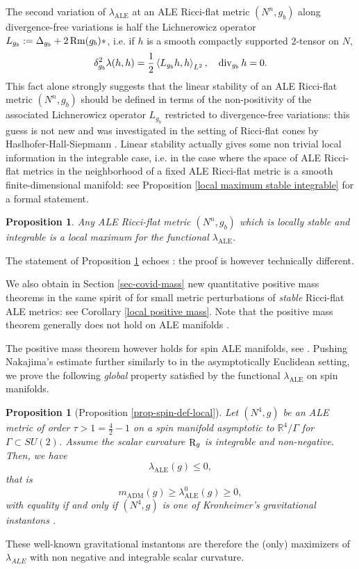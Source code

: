 \documentclass[a4paper,11pt,reqno]{amsart}
\newtheorem{prop}[defn]{Proposition}
\def\Rm{\mathop{\rm Rm}\nolimits}
\def\div{\mathop{\rm div}\nolimits}
\def\Rm{\mathop{\rm Rm}\nolimits}
\def\div{\mathop{\rm div}\nolimits}
\def\R{\mathop{\rm R}\nolimits}
\numberwithin{equation}{section}
\begin{document}
	The second variation of $\lambda_{\operatorname{ALE}}$ at an ALE Ricci-flat metric $(N^n,g_b)$ along divergence-free variations is half the Lichnerowicz operator $L_{g_b}:=\Delta_{g_b}+2\Rm(g_b)\ast$, i.e. if $h$ is a smooth compactly supported $2$-tensor on $N$,
	\begin{equation}
	\delta^2_{g_b}\lambda(h,h)=\frac{1}{2}\left<L_{g_b}h,h\right>_{L^2},\quad \div_{g_b}h=0.
	\end{equation}
	This fact alone strongly suggests that the linear stability of an ALE Ricci-flat metric $(N^n,g_b)$ should be defined in terms of the non-positivity of the associated Lichnerowicz operator $L_{g_b}$ restricted to divergence-free variations: this guess is not new and was investigated in the setting of Ricci-flat cones by Haslhofer-Hall-Siepmann \cite{Hal-Has-Sie}. Linear stability actually gives some non trivial local information in the integrable case, i.e. in the case where the space of ALE Ricci-flat metrics in the neighborhood of a fixed ALE Ricci-flat metric is a smooth finite-dimensional manifold: see Proposition \ref{local maximum stable integrable} for a formal statement.
\begin{prop}\label{prop-sta-int}
Any ALE Ricci-flat metric $(N^n,g_b)$ which is locally stable and integrable is a local maximum for the functional $\lambda_{\operatorname{ALE}}$.
\end{prop}
The statement of Proposition \ref{prop-sta-int} echoes \cite{Has-Sta}: the proof is however technically different.

We also obtain in Section \ref{sec-covid-mass} new quantitative positive mass theorems in the same spirit of \cite{Has-Per-Fct} for small metric perturbations of \emph{stable} Ricci-flat ALE metrics: see Corollary \ref{local positive mass}. Note that the positive mass theorem generally does not hold on ALE manifolds \cite{LeB-Counter-Mass}. 

The positive mass theorem however holds for spin ALE manifolds, see \cite{nak}. Pushing Nakajima's estimate further similarly to \cite{Has-Per-Fct} in the asymptotically Euclidean setting, we prove the following \emph{global} property satisfied by the functional $\lambda_{\operatorname{ALE}}$ on spin manifolds.
	\begin{prop}[Proposition \ref{prop-spin-def-local}]
		Let $(N^4,g)$ be an ALE metric of order $\tau>1 = \frac{4}{2}-1$ on a spin manifold asymptotic to $\mathbb{R}^4\slash\Gamma$ for $\Gamma\subset SU(2)$.
		Assume the scalar curvature $\R_g$ is integrable and non-negative. Then, we have $$\lambda_{\operatorname{ALE}}(g)\leq 0,$$
		that is
		$$m_{\operatorname{ADM}}(g)\geqslant\lambda_{\operatorname{ALE}}^0(g)\geqslant 0,$$
		with equality if and only if $(N^4,g)$ is one of Kronheimer's gravitational instantons \cite{kro}.
	\end{prop}
	These well-known gravitational instantons are therefore the (only) maximizers of $\lambda_{ALE}$ with non negative and integrable scalar curvature.
 
\end{document}
